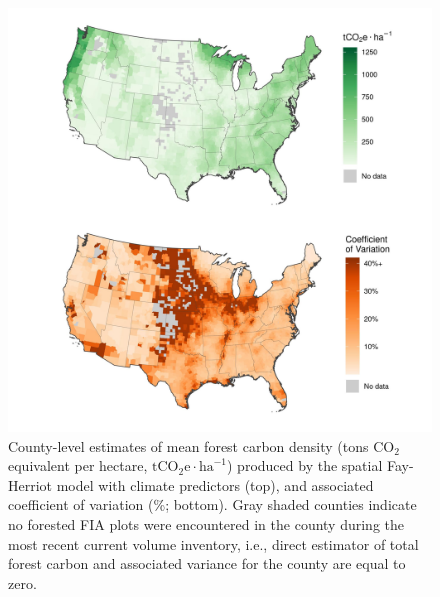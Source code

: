 \documentclass[11pt]{article}
\begin{document}
\begin{figure}[t!]
    \centering
    \includegraphics[width=6in]{figure1.jpg}
    \caption{County-level estimates of mean forest carbon density (tons $\mathrm{CO_2}$ equivalent per hectare, $\mathrm{tCO}_2\mathrm{e} \cdot \mathrm{ha}^{-1}$) produced by the spatial Fay-Herriot model with climate predictors (top), and associated coefficient of variation (\%; bottom). Gray shaded counties indicate no forested FIA plots were encountered in the county during the most recent current volume inventory, i.e., direct estimator of total forest carbon and associated variance for the county are equal to zero.}
    \label{fig:smoothed}
\end{figure}
\end{document}
